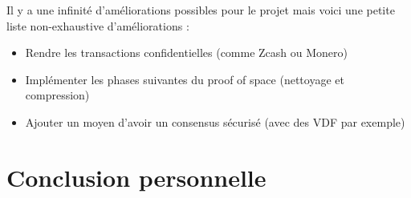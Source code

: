 Il y a une infinité d'améliorations possibles pour le projet mais voici une petite liste non-exhaustive d'améliorations :

\begin{itemize}
  \item Rendre les transactions confidentielles (comme Zcash ou Monero)
  \item Implémenter les phases suivantes du proof of space (nettoyage et compression)
  \item Ajouter un moyen d'avoir un consensus sécurisé (avec des VDF par exemple)
\end{itemize}

\section{Conclusion personnelle}
